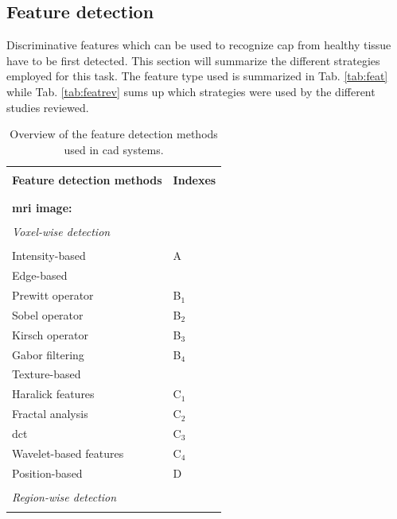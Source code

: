 \subsection{Feature detection} \label{subsec:featuredetection}

Discriminative features which can be used to recognize \ac{cap} from healthy tissue have to be first detected. This section will summarize the different strategies employed for this task. The feature type used is summarized in Tab. \ref{tab:feat} while Tab. \ref{tab:featrev} sums up which strategies were used by the different studies reviewed.

\begin{table}
	\caption{Overview of the feature detection methods used in \ac{cad} systems.}
	\small
	\renewcommand{\arraystretch}{.9}
	\begin{tabular}{p{.7\linewidth} >{\centering\arraybackslash}p{.20\linewidth}}
		\hline \\ [-1.5ex]
		\textbf{Feature detection methods} & \textbf{Indexes} \\ \\ [-1.5ex]
		\hline \\ [-1.5ex]
		\textbf{\ac{mri} image:} & \\ \\ [-1.5ex]
		\quad \textit{Voxel-wise detection} &  \\ \\ [-1.5ex]
		\quad \quad Intensity-based & A \\
		\quad \quad Edge-based & \\
		\quad \quad \quad Prewitt operator & B$_1$ \\
		\quad \quad \quad Sobel operator & B$_2$ \\
		\quad \quad \quad Kirsch operator & B$_3$ \\
		\quad \quad \quad Gabor filtering & B$_4$ \\ 
		\quad \quad Texture-based & \\
		\quad \quad \quad Haralick features & C$_1$ \\
		\quad \quad \quad Fractal analysis & C$_2$ \\
		\quad \quad \quad \Ac{dct} & C$_3$ \\
		\quad \quad \quad Wavelet-based features & C$_4$ \\
		\quad \quad Position-based & D \\ \\ [-1.5ex]
		\quad \textit{Region-wise detection} &  \\ \\ [-1.5ex]

\end{tabular}
\end{table}
